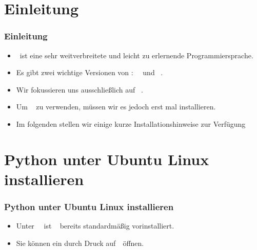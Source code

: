 \documentclass[aspectratio=169,mathserif,notheorems]{beamer}%
\subtitle{3.~Python Installieren}%
\begin{document}
%
%
\startPresentation%
%
\section{Einleitung}%
%
\begin{frame}%
\frametitle{Einleitung}%
\begin{itemize}%
\item \python\ ist eine sehr weitverbreitete\cite{CBST2024LOHPPTDDSAMLA,B2023G2GLS} und leicht zu erlernende\cite{GPBS2006WCTIPIHSUP,VR1999CPFERPASEFTPOT} Programmiersprache.%
\item<2-> Es gibt zwei wichtige Versionen von \python:~\python~ und \python~.%
\item<3-> Wir fokussieren uns ausschließlich auf \python~.%
\item<4-> Um \python~ zu verwenden, müssen wir es jedoch erst mal installieren.%
\item<5-> Im folgenden stellen wir einige kurze Installationshinweise zur Verfügung
\end{itemize}%
\end{frame}%
%
\section{Python unter Ubuntu Linux installieren}%
%
\begin{frame}[t]%
\frametitle{Python unter Ubuntu Linux installieren}%
\begin{itemize}%
\item Unter \ubuntu\ \linux\ ist \python~ bereits standardmäßig vorinstalliert.%
\item<2-> Sie können ein \cite{B2022ELATCL} durch Druck auf~\ubuntuTerminal\ öffnen.%
\end{itemize}%
%
%
\end{frame}%
%
\end{document}
